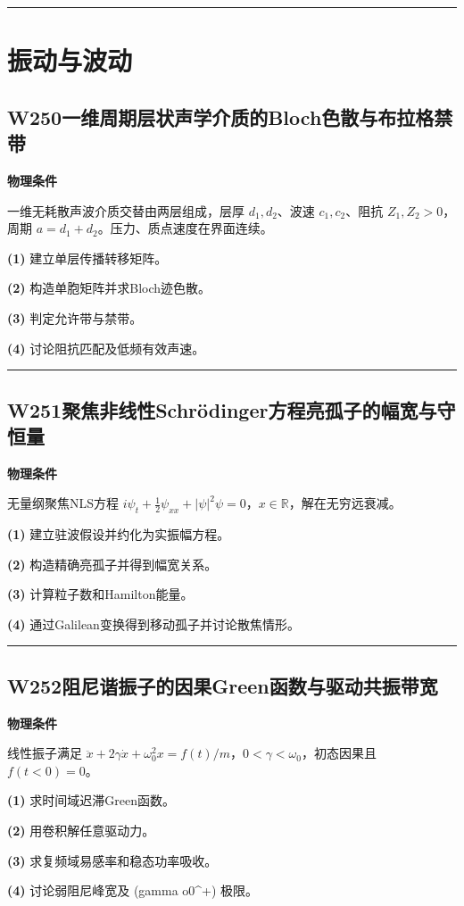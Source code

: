 \documentclass[UTF8,a4paper,11pt,oneside,openany]{ctexbook}
\begin{document}
\par\bigskip\hrule\bigskip
\chapter{振动与波动}
\section*{W250\quad 一维周期层状声学介质的Bloch色散与布拉格禁带}
\textbf{物理条件}\par 一维无耗散声波介质交替由两层组成，层厚 \(d_1,d_2\)、波速 \(c_1,c_2\)、阻抗 \(Z_1,Z_2>0\)，周期 \(a=d_1+d_2\)。压力、质点速度在界面连续。
\par\noindent\textbf{(1)} 建立单层传播转移矩阵。
\par\noindent\textbf{(2)} 构造单胞矩阵并求Bloch迹色散。
\par\noindent\textbf{(3)} 判定允许带与禁带。
\par\noindent\textbf{(4)} 讨论阻抗匹配及低频有效声速。

\par\bigskip\hrule\bigskip
\section*{W251\quad 聚焦非线性Schrödinger方程亮孤子的幅宽与守恒量}
\textbf{物理条件}\par 无量纲聚焦NLS方程 \(i\psi_t+\tfrac12\psi_{xx}+|\psi|^2\psi=0\)，\(x\in\mathbb R\)，解在无穷远衰减。
\par\noindent\textbf{(1)} 建立驻波假设并约化为实振幅方程。
\par\noindent\textbf{(2)} 构造精确亮孤子并得到幅宽关系。
\par\noindent\textbf{(3)} 计算粒子数和Hamilton能量。
\par\noindent\textbf{(4)} 通过Galilean变换得到移动孤子并讨论散焦情形。

\par\bigskip\hrule\bigskip
\section*{W252\quad 阻尼谐振子的因果Green函数与驱动共振带宽}
\textbf{物理条件}\par 线性振子满足 \(\ddot x+2\gamma\dot x+\omega_0^2x=f(t)/m\)，\(0<\gamma<\omega_0\)，初态因果且 \(f(t<0)=0\)。
\par\noindent\textbf{(1)} 求时间域迟滞Green函数。
\par\noindent\textbf{(2)} 用卷积解任意驱动力。
\par\noindent\textbf{(3)} 求复频域易感率和稳态功率吸收。
\par\noindent\textbf{(4)} 讨论弱阻尼峰宽及 (gamma	o0\textasciicircum{}+) 极限。
\end{document}
